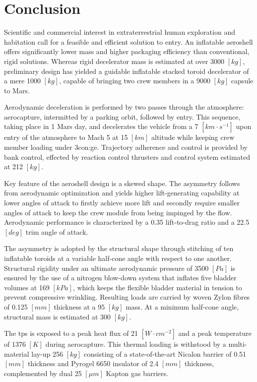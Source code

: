 \section{Conclusion}

Scientific and commercial interest in extraterrestrial human exploration and habitation call for a feasible and efficient solution to entry. An inflatable aeroshell offers significantly lower mass and higher packaging efficiency than conventional, rigid solutions. Whereas rigid decelerator mass is estimated at over 3000 $ \left[ kg \right] $, preliminary design has yielded a guidable inflatable stacked toroid decelerator of a mere 1000 $ \left[ kg \right] $, capable of bringing two crew members in a 9000 $ \left[ kg \right] $ capsule to Mars.

Aerodynamic deceleration is performed by two passes through the atmosphere: aerocapture, intermitted by a parking orbit, followed by entry. This sequence, taking place in 1 Mars day, and decelerates the vehicle from a 7 $ \left[ km \cdot s^{-1} \right] $ upon entry of the atmosphere to Mach 5 at 15 $ \left[ km \right] $ altitude while keeping crew member loading under 3\gls{con:ge}. Trajectory adherence and control is provided by bank control, effected by reaction control thrusters and control system estimated at 212 $ \left[ kg \right] $.

Key feature of the aeroshell design is a skewed shape. The asymmetry follows from aerodynamic optimization and yields higher lift-generating capability at lower angles of attack to firstly achieve more lift and secondly require smaller angles of attack to keep the crew module from being impinged by the flow. Aerodynamic performance is characterized by a 0.35 lift-to-drag ratio and a 22.5 $ \left[ deg \right] $ trim angle of attack.

The asymmetry is adopted by the structural shape through stitching of ten inflatable toroids at a variable half-cone angle with respect to one another. Structural rigidity under an ultimate aerodynamic pressure of 3500 $ \left[ Pa \right] $ is ensured by the use of a nitrogen blow-down system that inflates five bladder volumes at 169 $ \left[ kPa \right] $, which keeps the flexible bladder material in tension to prevent compressive wrinkling. Resulting loads are carried by woven Zylon fibres of 0.125 $ \left[ mm \right] $ thickness at a 95 $ \left[ kg \right] $ mass. At a minimum half-cone angle,  structural mass is estimated at 300 $ \left[ kg \right] $. 

The \acrlong{tps} is exposed to a peak heat flux of 21 $ \left[ W \cdot cm^{-2} \right] $ and a peak temperature of 1376 $ \left[ K \right] $ during aerocapture. This thermal loading is withstood by a multi-material lay-up 256 $ \left[ kg \right] $ consisting of a state-of-the-art Nicalon barrier of 0.51 $ \left[ mm \right] $  thickness and Pyrogel 6650 insulator of 2.4 $ \left[ mm \right] $  thickness, complemented by dual 25 $ \left[ \mu m \right] $  Kapton gas barriers. 

